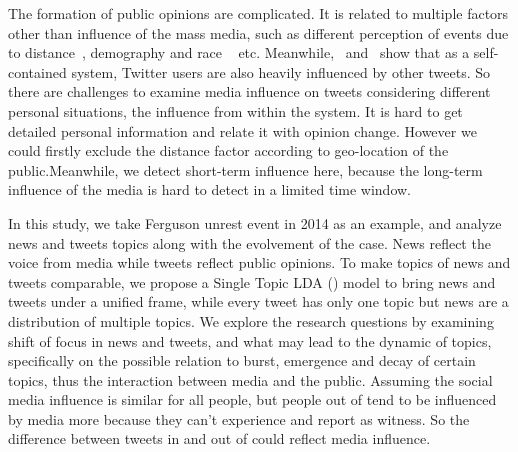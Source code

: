The formation of public opinions are complicated. It is related to multiple factors other than influence of the mass media, such as different perception of events due to distance~\cite{he2015uncovering}, demography and race ~\cite{page1987moves} etc. Meanwhile,~ and~ show that as a self-contained system, Twitter users are also heavily influenced by other tweets. So there are challenges to examine media influence on tweets considering different personal situations, the influence from within the system. It is hard to get detailed personal information and relate it with opinion change. However we could firstly exclude the distance factor according to geo-location of the public.Meanwhile, we detect short-term influence here, because the long-term influence of the media is hard to detect in a limited time window.

In this study, we take Ferguson unrest event in 2014 as an example, and analyze news and tweets topics along with the evolvement of the case. News reflect the voice from media while tweets reflect public opinions. To make topics of news and tweets comparable, we propose a Single Topic LDA (\stlda) model to bring news and tweets under a unified frame, while every tweet has only one topic but news are a distribution of multiple topics. We explore the research questions by examining shift of focus in news and tweets, and what may lead to the dynamic of topics, specifically on the possible relation to burst, emergence and decay of certain topics, thus the interaction between media and the public. Assuming the social media influence is similar for all people, but people out of \stlouis tend to be influenced by media more because they can't experience and report as witness. So the difference between tweets in and out of \stlouis could reflect media influence.

